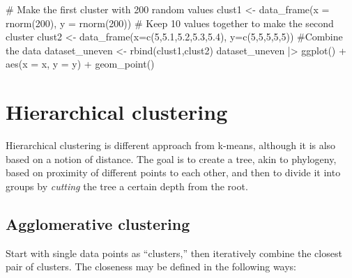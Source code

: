 \documentclass[
  letterpaper,
  DIV=11,
  numbers=noendperiod]{scrreprt}
\newenvironment{Shaded}{\begin{snugshade}}{\end{snugshade}}
\newcommand{\NormalTok}[1]{\textcolor[rgb]{0.00,0.23,0.31}{#1}}
\begin{document}
\begin{Shaded}
\begin{Highlighting}[]
\NormalTok{\# Make the first cluster with 200 random values}
\NormalTok{clust1 \textless{}{-} data\_frame(x = rnorm(200), }
\NormalTok{                     y = rnorm(200))}
\NormalTok{\# Keep 10 values together to make the second cluster}
\NormalTok{clust2 \textless{}{-} data\_frame(x=c(5,5.1,5.2,5.3,5.4),}
\NormalTok{                     y=c(5,5,5,5,5))}
\NormalTok{\#Combine the data}
\NormalTok{dataset\_uneven \textless{}{-} rbind(clust1,clust2)}
\NormalTok{dataset\_uneven |\textgreater{} ggplot() + aes(x = x, y = y) + geom\_point()}
\end{Highlighting}
\end{Shaded}

\begin{Shaded}
\end{Shaded}

\section{Hierarchical clustering}\label{hierarchical-clustering}

Hierarchical clustering is different approach from k-means, although it
is also based on a notion of distance. The goal is to create a tree,
akin to phylogeny, based on proximity of different points to each other,
and then to divide it into groups by \emph{cutting} the tree a certain
depth from the root.

\subsection{Agglomerative clustering}\label{agglomerative-clustering}

Start with single data points as ``clusters,'' then iteratively combine
the closest pair of clusters. The closeness may be defined in the
following ways:
\end{document}
